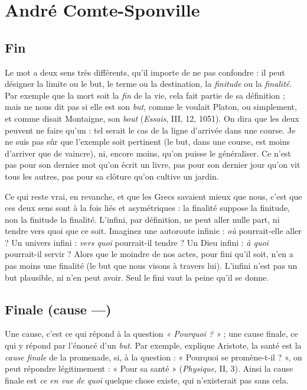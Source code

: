 
\section{André Comte-Sponville}
\subsection{Fin}

Le mot a deux sens très différents, qu’il importe de ne pas confondre :
il peut désigner la limite ou le but, le terme ou la destination, la {\it finitude}
ou la {\it finalité}. Par exemple que la mort soit la {\it fin} de la vie, cela fait partie
de sa définition ; mais ne nous dit pas si elle est son {\it but}, comme le voulait
Platon, ou simplement, et comme disait Montaigne, son {\it bout} ({\it Essais}, III, 12,
1051). On dira que les deux peuvent ne faire qu’un : tel serait le cas de la ligne
d’arrivée dans une course. Je ne suis pas sûr que l’exemple soit pertinent (le but,
dans une course, est moins d’arriver que de vaincre), ni, encore moins, qu’on
puisse le généraliser. Ce n’est pas pour son dernier mot qu’on écrit un livre, pas
pour son dernier jour qu’on vit tous les autres, pas pour sa clôture qu’on cultive
un jardin.

Ce qui reste vrai, en revanche, et que les Grecs savaient mieux que nous,
c’est que ces deux sens sont à la fois liés et asymétriques : la finalité suppose la
finitude, non la finitude la finalité. L’infini, par définition, ne peut aller nulle
part, ni tendre vers quoi que ce soit. Imaginez une autoroute infinie : {\it où} pourrait-elle
aller ? Un univers infini : {\it vers quoi} pourrait-il tendre ? Un Dieu infini :
{\it à quoi} pourrait-il servir ? Alors que le moindre de nos actes, pour fini qu’il soit,
n’en a pas moins une finalité (le but que nous visons à travers lui). L’infini n’est
pas un but plausible, ni n’en peut avoir. Seul le fini vaut la peine qu’il se donne.

\subsection{Finale (cause —)}

Une cause, c’est ce qui répond à la question {\it « Pourquoi ? »} ;
une cause finale, ce qui y répond par l’énoncé
d’un {\it but}. Par exemple, explique Aristote, la santé est la {\it cause finale} de la promenade,
si, à la question : « Pourquoi se promène-t-il ? », on peut répondre
légitimement : « Pour sa santé » ({\it Physique}, II, 3). Ainsi la cause finale est {\it ce en
vue de quoi} quelque chose existe, qui n’existerait pas sans cela.


